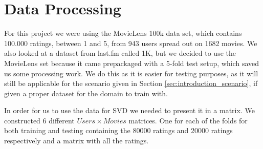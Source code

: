 \section{Data Processing}\label{sec:data_preprocessing}
For this project we were using the MovieLens 100k data set, which contains 100.000 ratings, between 1 and 5, from 943 users spread out on 1682 movies\cite{movielens100k}. 
We also looked at a dataset from last.fm called 1K\cite{lastfmdataset}, but we decided to use the MovieLens set because it came prepackaged with a 5-fold test setup, which saved us some processing work. We do this as it is easier for testing purposes, as it will still be applicable for the scenario given in Section \ref{sec:introduction_scenario}, if given a proper dataset for the domain to train with.

In order for us to use the data for SVD we needed to present it in a matrix. We constructed 6 different $Users \times Movies$ matrices. One for each of the folds for both training and testing containing the 80000 ratings and 20000 ratings respectively and a matrix with all the ratings.